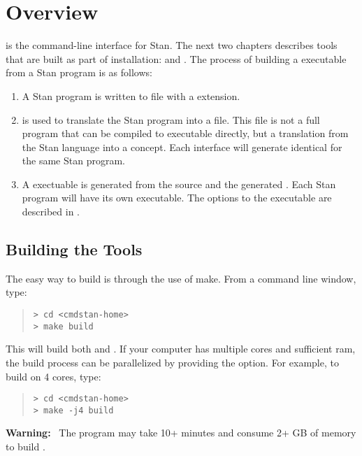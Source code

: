 \chapter{Overview}

\noindent
\CmdStan is the command-line interface for Stan. The next two
chapters describes tools that are built as part of \CmdStan
installation:  and . The process of building a
\CmdStan executable from a Stan program is as follows:
%
\begin{enumerate}
  \item A Stan program is written to file with a 
    extension.
  \item {} is used to translate the Stan program into a
    \Cpp file. This \Cpp file is not a full program that can be
    compiled to executable directly, but a translation from the Stan
    language into a \Cpp concept. Each interface will generate identical
    \Cpp for the same Stan program.
  \item A \CmdStan exectuable is generated from the \CmdStan source
    and the generated \Cpp. Each Stan program will have its own
    \CmdStan executable. The options to the \CmdStan executable are
    described in .
\end{enumerate}


\section{Building the \CmdStan Tools}\label{build.section}

The easy way to build \CmdStan is through the use of make. From a
command line window, type:
%
\begin{quote}
\begin{Verbatim}[fontshape=sl,fontsize=\small]
> cd <cmdstan-home>
> make build
\end{Verbatim}
\end{quote}
%
This will build both  and . If your computer
has multiple cores and sufficient ram, the build process can be parallelized
by providing the  option. For example, to build on 4 cores, type:
%
\begin{quote}
\begin{Verbatim}[fontshape=sl,fontsize=\small]
> cd <cmdstan-home>
> make -j4 build
\end{Verbatim}
\end{quote}
%
\textbf{Warning:} \ The  program may take 10+ minutes and
consume 2+ GB of memory to build \CmdStan.
